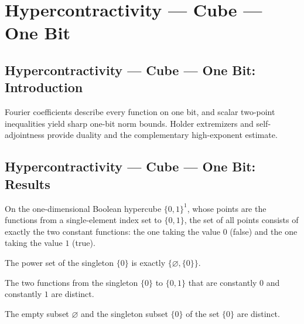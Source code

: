 \section{Hypercontractivity --- Cube --- One Bit}
\subsection*{Hypercontractivity --- Cube --- One Bit: Introduction}
Fourier coefficients describe every function on one bit, and scalar two-point inequalities yield sharp one-bit norm bounds. Holder extremizers and self-adjointness provide duality and the complementary high-exponent estimate.

\subsection*{Hypercontractivity --- Cube --- One Bit: Results}

\begin{lemma}
\leanok
{}
\label{BooleanAnalysis.Hypercontractivity.boolCube1_univ}
On the one-dimensional Boolean hypercube $\{0,1\}^1$, whose points are the functions
from a single-element index set to $\{0,1\}$, the set of all points consists of exactly
the two constant functions: the one taking the value $0$ (false) and the one taking the
value $1$ (true).
\end{lemma}

\begin{lemma}
\leanok
{}
\label{BooleanAnalysis.Hypercontractivity.finsetFin1_univ}
The power set of the singleton $\{0\}$ is exactly $\{\varnothing,\{0\}\}$.
\end{lemma}

\begin{lemma}
\leanok
{}
\label{BooleanAnalysis.Hypercontractivity.boolCube1_ne}
The two functions from the singleton $\{0\}$ to $\{0,1\}$ that are constantly $0$ and
constantly $1$ are distinct.
\end{lemma}

\begin{lemma}
\leanok
{}
\label{BooleanAnalysis.Hypercontractivity.finsetFin1_ne}
The empty subset $\varnothing$ and the singleton subset $\{0\}$ of the set $\{0\}$ are
distinct.
\end{lemma}

